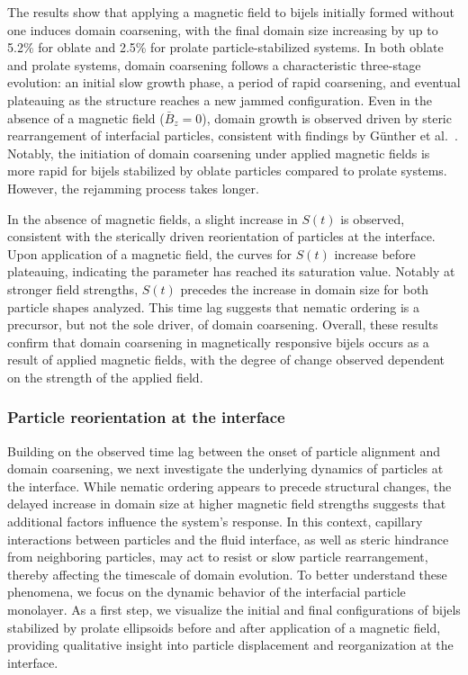 The results show that applying a magnetic field to bijels 
initially formed without one induces domain coarsening, with the final domain size increasing by up to 5.2\% for oblate and 2.5\% for 
prolate particle-stabilized systems.
In both oblate and prolate systems, domain coarsening follows a characteristic three-stage evolution: an initial slow growth phase, a period of rapid 
coarsening, and eventual plateauing as the structure reaches a new jammed configuration. Even in the absence of a magnetic field (\(\bar{B}_z = 0\)), 
domain growth is observed driven by steric rearrangement of interfacial particles, consistent 
with findings by Günther et al.~\cite{gunther_timescales_2014}. Notably, the initiation of domain coarsening under applied magnetic fields is more rapid 
for bijels stabilized by oblate particles compared to prolate systems. However, the rejamming process takes longer.

In the absence of magnetic fields, a slight increase in $S(t)$ is observed, consistent with the sterically driven reorientation of particles at the interface.
\cite{gunther_timescales_2014} Upon application of a magnetic field, the curves for \(S(t)\) increase before plateauing, indicating the parameter has reached
its saturation value. Notably at stronger field strengths, $S(t)$ precedes the increase in domain size for both particle shapes analyzed. This time lag suggests 
that nematic ordering is a precursor, but not the sole driver, of domain coarsening. Overall, these results confirm that domain coarsening in magnetically 
responsive bijels occurs as a result of applied magnetic fields, with the degree of change observed dependent on the strength of the applied field. 

\subsubsection{Particle reorientation at the interface}

Building on the observed time lag between the onset of particle alignment and domain coarsening, we next investigate the underlying dynamics of particles at the 
interface. While nematic ordering appears to precede structural changes, the delayed increase in domain size at higher magnetic field strengths suggests that 
additional factors influence the system's response. In this context, capillary interactions between particles and the fluid interface, as well as steric hindrance 
from neighboring particles, may act to resist or slow particle rearrangement, thereby affecting the timescale of domain evolution. To better understand these 
phenomena, we focus on the dynamic behavior of the interfacial particle monolayer. As a first step, we visualize the initial and final configurations of bijels 
stabilized by prolate ellipsoids before and after application of a magnetic field, providing qualitative insight into particle displacement and reorganization 
at the interface.

